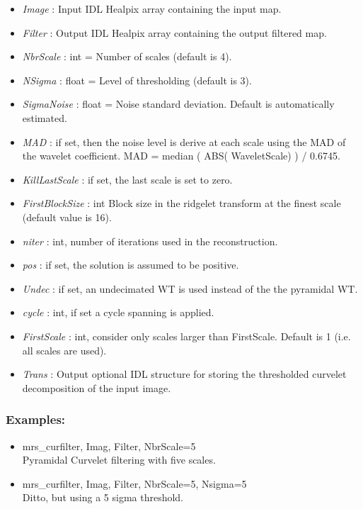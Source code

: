 \begin{itemize}
\item {\em Image} : Input IDL Healpix array containing the input map.
\item {\em Filter} : Output IDL Healpix array containing the output filtered map.
\item {\em NbrScale} : int = Number of scales (default is 4).
\item {\em NSigma} : float = Level of thresholding (default is 3).
\item {\em SigmaNoise} : float = Noise standard deviation. Default is automatically estimated.
\item {\em MAD} : if set, then the noise level is derive at each scale using the MAD of the   
wavelet coefficient. MAD = median ( ABS( WaveletScale) ) / 0.6745.
\item {\em KillLastScale} : if set, the last scale is set to zero.
\item {\em FirstBlockSize} : int Block size in the ridgelet transform at the finest scale (default value is 16).
\item {\em niter} : int, number of iterations used in the reconstruction.
\item {\em pos} : if set, the solution is assumed to be positive.
\item {\em Undec} : if set, an undecimated WT is used instead of the the pyramidal WT.
\item {\em cycle} : int, if set a cycle spanning is applied.
\item {\em FirstScale} : int, consider only scales larger than FirstScale. Default is 1 (i.e. all scales are used).
\item {\em Trans} : Output optional IDL structure for storing the thresholded curvelet decomposition of the input image.
\end{itemize}

\subsubsection*{Examples:} 
\begin{itemize}
\item mrs\_curfilter, Imag, Filter, NbrScale=5 \\
Pyramidal  Curvelet filtering with five scales.
\item mrs\_curfilter, Imag, Filter, NbrScale=5, Nsigma=5 \\
Ditto, but using a 5 sigma threshold.
\end{itemize}



